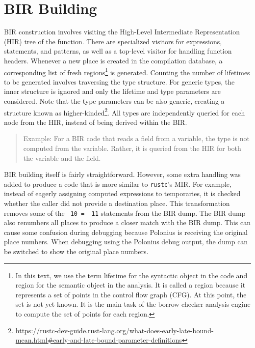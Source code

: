 \documentclass[
  11pt,
  twoside,symmetric]{report}
\DeclareRobustCommand{\href}[2]{#2\footnote{\url{#1}}}
\begin{document}
\section{BIR Building}\label{sec:bir-building}

BIR construction involves visiting the High-Level Intermediate
Representation (HIR) tree of the function. There are specialized
visitors for expressions, statements, and patterns, as well as a
top-level visitor for handling function headers. Whenever a new place is
created in the compilation database, a corresponding list of fresh
regions\footnote{In this text, we use the term lifetime for the
  syntactic object in the code and region for the semantic object in the
  analysis. It is called a region because it represents a set of points
  in the control flow graph (CFG). At this point, the set is not yet
  known. It is the main task of the borrow checker analysis engine to
  compute the set of points for each region.} is generated. Counting the
number of lifetimes to be generated involves traversing the type
structure. For generic types, the inner structure is ignored and only
the lifetime and type parameters are considered. Note that the type
parameters can be also generic, creating a structure known as
\href{https://rustc-dev-guide.rust-lang.org/what-does-early-late-bound-mean.html\#early-and-late-bound-parameter-definitions}{higher-kinded}.
All types are independently queried for each node from the HIR, instead
of being derived within the BIR.

\begin{quote}
Example: For a BIR code that reads a field from a variable, the type is
not computed from the variable. Rather, it is queried from the HIR for
both the variable and the field.
\end{quote}

BIR building itself is fairly straightforward. However, some extra
handling was added to produce a code that is more similar to
\texttt{rustc}'s MIR. For example, instead of eagerly assigning computed
expressions to temporaries, it is checked whether the caller did not
provide a destination place. This transformation removes some of the
\texttt{\_10\ =\ \_11} statements from the BIR dump. The BIR dump also
renumbers all places to produce a closer match with the BIR dump. This
can cause some confusion during debugging because Polonius is receiving
the original place numbers. When debugging using the Polonius debug
output, the dump can be switched to show the original place numbers.
\end{document}

